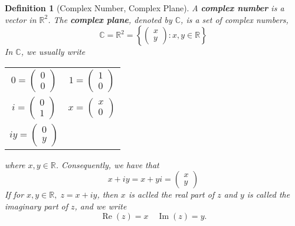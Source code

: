 \documentclass[11pt, oneside]{book}
\theoremstyle{break}
\newtheorem{defn}{Definition}[section]
\DeclareMathOperator{\re}{Re}
\DeclareMathOperator{\im}{Im}
\begin{document}
\begin{defn}[Complex Number, Complex Plane]\label{defn:Complex Number, Complex Plane}
	A \textbf{complex number} is a vector in $\mathbb{R}^2$. The \textbf{complex plane}, denoted by $\mathbb{C}$, is a set of complex numbers,
	\begin{equation*}
		\mathbb{C} = \mathbb{R}^2 = \left\{ \begin{pmatrix} x \\ y \end{pmatrix} : x , y \in \mathbb{R} \right\}
	\end{equation*}
	In $\mathbb{C}$, we usually write \\
	\begin{center}
		\begin{tabular}{c c}
			$0 = \begin{pmatrix} 0 \\ 0 \end{pmatrix}$ & $1 = \begin{pmatrix} 1 \\ 0 \end{pmatrix}$ \\
			$i = \begin{pmatrix} 0 \\ 1 \end{pmatrix}$ & $x = \begin{pmatrix} x \\ 0 \end{pmatrix}$ \\
			$iy = \begin{pmatrix} 0 \\ y \end{pmatrix}$
		\end{tabular}
	\end{center}
	where $x, y \in \mathbb{R}$. Consequently, we have that
	\begin{equation*}
		x + iy = x + yi = \begin{pmatrix} x \\ y \end{pmatrix}
	\end{equation*}
	If for $x, y \in \mathbb{R}, \; z = x + iy$, then $x$ is aclled the real part of $z$ and $y$ is called the imaginary part of $z$, and we write
	\begin{equation*}
		\re(z) = x \quad \im(z) = y.
	\end{equation*}
\end{defn}
\end{document}
